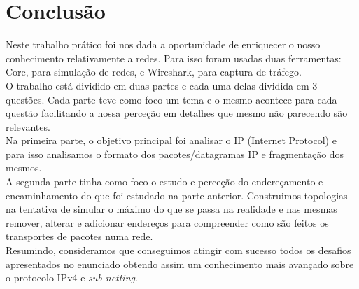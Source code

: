 \documentclass[a4paper]{report}
\begin{document}
\chapter{Conclusão}
Neste trabalho prático foi nos dada a oportunidade de enriquecer o nosso conhecimento
relativamente a redes. Para isso foram usadas duas ferramentas: Core, para simulação de 
redes, e Wireshark, para captura de tráfego.\\
O trabalho está dividido em duas partes e cada uma delas dividida em 3 questões.
Cada parte teve como foco um tema e o mesmo acontece para cada questão facilitando a
nossa perceção em detalhes que mesmo não parecendo são relevantes.\\
Na primeira parte, o objetivo principal foi analisar o IP (Internet Protocol) e para isso
analisamos o formato dos pacotes/datagramas IP e fragmentação dos mesmos.\\
A segunda parte tinha como foco o estudo e perceção do endereçamento e encaminhamento do
que foi estudado na parte anterior. Construimos topologias na tentativa de simular 
o máximo do que se passa na realidade e nas mesmas remover, alterar e adicionar 
endereços para compreender como são feitos os transportes de pacotes numa rede.\\
Resumindo, consideramos que conseguimos atingir com sucesso todos os
desafios apresentados no enunciado obtendo assim um conhecimento mais avançado
sobre o protocolo IPv4 e \textit{sub-netting}.
\end{document}
